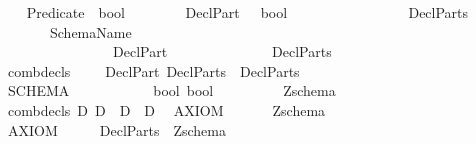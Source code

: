 \begin{isabellebody}
\isanewline
\isanewline
\isanewline
\isanewline
\isanewline
\isanewline
\isanewline
\isanewline
\ \isanewline
\isanewline
{}\isamarkupfalse%
\ \ \ Predicate\ {\isacharequal}\ bool\isanewline
\ \ \ \ \ \ \ \ DeclPart\ \ {\isacharequal}\ bool\isanewline
\ \ \ \ \ \ \ \ \isanewline
{}\isamarkupfalse%
\isanewline
\ \ \ \ \ \ \ \ DeclParts\ \ \isanewline
\ \ \ \ \ \ \ \ SchemaName\ \isanewline
\ \isanewline
{}\isamarkupfalse%
\isanewline
\ \ {\isachardoublequoteopen}{\isachardoublequoteclose}\ \ \ \ \ \ \ \ \ \ \ \ \ \ {\isacharcolon}{\isacharcolon}\ {\isachardoublequoteopen}DeclPart\ \ \ \ \ \ \ \ \ \ \ \ \ \ {\isacharequal}{\isachargreater}\ DeclParts{\isachardoublequoteclose}\ {\isacharparenleft}{\isachardoublequoteopen}{\isacharunderscore}{\isachardoublequoteclose}{\isacharparenright}\isanewline
\ \ {\isachardoublequoteopen}{\isacharunderscore}combdecls{\isachardoublequoteclose}\ \ \ \ {\isacharcolon}{\isacharcolon}\ {\isachardoublequoteopen}{\isacharbrackleft}DeclPart{\isacharcomma}\ DeclParts{\isacharbrackright}\ {\isacharequal}{\isachargreater}\ DeclParts{\isachardoublequoteclose}\ {\isacharparenleft}{\isachardoublequoteopen}{\isacharunderscore}{\isacharsemicolon}{\isacharslash}\ {\isacharunderscore}{\isachardoublequoteclose}{\isacharparenright}\ \ \isanewline
\ \ \isanewline
{}\isamarkupfalse%
\isanewline
\ \ SCHEMA\ \ \ \ \ \ \ \ \ \ {\isacharcolon}{\isacharcolon}\ \ {\isachardoublequoteopen}{\isacharbrackleft}bool{\isacharcomma}\ bool{\isacharbrackright}\ \ \ \ \ \ \ \ \ {\isacharequal}{\isachargreater}\ Zschema\ {\isachardoublequoteclose}\isanewline
\isanewline
{}\isamarkupfalse%
\isanewline
\ \ {\isachardoublequoteopen}{\isacharunderscore}combdecls\ D\ D{}{\isachardoublequoteclose}\ {\isacharequal}{\isachargreater}\ {\isachardoublequoteopen}D\ {\isacharampersand}\ D{}{\isachardoublequoteclose}\isanewline
\isanewline
{}\isamarkupfalse%
\isanewline
\ \ {\isachardoublequoteopen}{\isacharunderscore}AXIOM{}{\isachardoublequoteclose}\ \ \ \ \ {\isacharcolon}{\isacharcolon}\ \ {\isachardoublequoteopen}Zschema{\isachardoublequoteclose}\ \ \isanewline
\ \ \ \ \ \ \ \ \ \ \ \ \ \ \ \ \ \ \ {\isacharparenleft}{\isachardoublequoteopen}{\isacharplus}{\isachardot}{\isachardot}\ {\isacharslash}{\isacharslash}{\isacharminus}{\isachardot}{\isachardot}{\isachardoublequoteclose}{\isacharparenright}\ \isanewline
\ \ {\isachardoublequoteopen}{\isacharunderscore}AXIOM{}{\isachardoublequoteclose}\ \ \ \ \ {\isacharcolon}{\isacharcolon}\ {\isachardoublequoteopen}DeclParts\ {\isacharequal}{\isachargreater}\ Zschema{\isachardoublequoteclose}\ \ \isanewline

\end{isabellebody}
